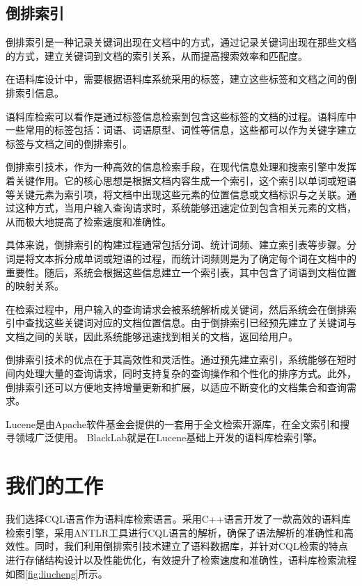 \documentclass[11pt]{article}
\begin{document}
\begin{CJK*}{UTF8}{gbsn}
\subsection{倒排索引}

倒排索引是一种记录关键词出现在文档中的方式，通过记录关键词出现在那些文档的方式，建立关键词到文档的索引关系，从而提高搜索效率和匹配度。

在语料库设计中，需要根据语料库系统采用的标签，建立这些标签和文档之间的倒排索引信息。

语料库检索可以看作是通过标签信息检索到包含这些标签的文档的过程。语料库中一些常用的标签包括：词语、词语原型、词性等信息，这些都可以作为关键字建立标签与文档之间的倒排索引。

倒排索引技术，作为一种高效的信息检索手段，在现代信息处理和搜索引擎中发挥着关键作用。它的核心思想是根据文档内容生成一个索引，这个索引以单词或短语等关键元素为索引项，将文档中出现这些元素的位置信息或文档标识与之关联。通过这种方式，当用户输入查询请求时，系统能够迅速定位到包含相关元素的文档，从而极大地提高了检索速度和准确性。

具体来说，倒排索引的构建过程通常包括分词、统计词频、建立索引表等步骤。分词是将文本拆分成单词或短语的过程，而统计词频则是为了确定每个词在文档中的重要性。随后，系统会根据这些信息建立一个索引表，其中包含了词语到文档位置的映射关系。

在检索过程中，用户输入的查询请求会被系统解析成关键词，然后系统会在倒排索引中查找这些关键词对应的文档位置信息。由于倒排索引已经预先建立了关键词与文档之间的关联，因此系统能够迅速找到相关的文档，返回给用户。

倒排索引技术的优点在于其高效性和灵活性。通过预先建立索引，系统能够在短时间内处理大量的查询请求，同时支持复杂的查询操作和个性化的排序方式。此外，倒排索引还可以方便地支持增量更新和扩展，以适应不断变化的文档集合和查询需求。


Lucene是由Apache软件基金会提供的一套用于全文检索开源库，在全文索引和搜寻领域广泛使用。 BlackLab就是在Lucene基础上开发的语料库检索引擎。


\section{我们的工作}

我们选择CQL语言作为语料库检索语言。采用C++语言开发了一款高效的语料库检索引擎，采用ANTLR工具进行CQL语言的解析，确保了语法解析的准确性和高效性。同时，我们利用倒排索引技术建立了语料数据库，并针对CQL检索的特点进行存储结构设计以及性能优化，有效提升了检索速度和准确性，语料库检索流程如图\ref{fig:liucheng}所示。


\end{CJK*}
\end{document}
